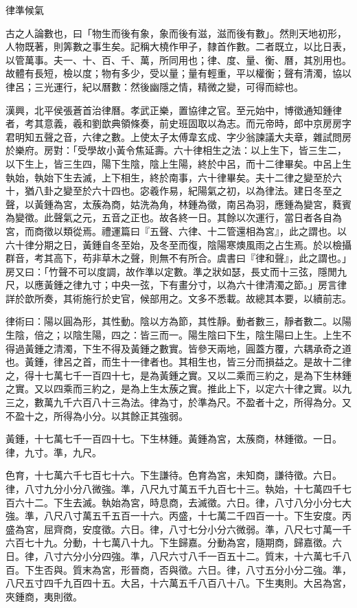 
\begin{pinyinscope}
律準候氣

古之人論數也，曰「物生而後有象，象而後有滋，滋而後有數」。然則天地初形，人物既著，則筭數之事生矣。記稱大橈作甲子，隸首作數。二者既立，以比日表，以管萬事。夫一、十、百、千、萬，所同用也；律、度、量、衡、曆，其別用也。故體有長短，檢以度；物有多少，受以量；量有輕重，平以權衡；聲有清濁，協以律呂；三光運行，紀以曆數：然後幽隱之情，精微之變，可得而綜也。

漢興，北平侯張蒼首治律曆。孝武正樂，置協律之官。至元始中，博徵通知鍾律者，考其意義，羲和劉歆典領條奏，前史班固取以為志。而元帝時，郎中京房房字君明知五聲之音，六律之數。上使太子太傅韋玄成、字少翁諫議大夫章，雜試問房於樂府。房對：「受學故小黃令焦延壽。六十律相生之法：以上生下，皆三生二，以下生上，皆三生四，陽下生陰，陰上生陽，終於中呂，而十二律畢矣。中呂上生執始，執始下生去滅，上下相生，終於南事，六十律畢矣。夫十二律之變至於六十，猶八卦之變至於六十四也。宓羲作易，紀陽氣之初，以為律法。建日冬至之聲，以黃鍾為宮，太蔟為商，姑洗為角，林鍾為徵，南呂為羽，應鍾為變宮，蕤賓為變徵。此聲氣之元，五音之正也。故各終一日。其餘以次運行，當日者各自為宮，而商徵以類從焉。禮運篇曰『五聲、六律、十二管還相為宮』，此之謂也。以六十律分期之日，黃鍾自冬至始，及冬至而復，陰陽寒燠風雨之占生焉。於以檢攝群音，考其高下，苟非草木之聲，則無不有所合。虞書曰『律和聲』，此之謂也。」房又曰：「竹聲不可以度調，故作準以定數。準之狀如瑟，長丈而十三弦，隱閒九尺，以應黃鍾之律九寸；中央一弦，下有畫分寸，以為六十律清濁之節。」房言律詳於歆所奏，其術施行於史官，候部用之。文多不悉載。故總其本要，以續前志。

律術曰：陽以圓為形，其性動。陰以方為節，其性靜。動者數三，靜者數二。以陽生陰，倍之；以陰生陽，四之：皆三而一。陽生陰曰下生，陰生陽曰上生。上生不得過黃鍾之清濁，下生不得及黃鍾之數實。皆參天兩地，圓蓋方覆，六耦承奇之道也。黃鍾，律呂之首，而生十一律者也。其相生也，皆三分而損益之。是故十二律之，得十七萬七千一百四十七，是為黃鍾之實。又以二乘而三約之，是為下生林鍾之實。又以四乘而三約之，是為上生太蔟之實。推此上下，以定六十律之實。以九三之，數萬九千六百八十三為法。律為寸，於準為尺。不盈者十之，所得為分。又不盈十之，所得為小分。以其餘正其強弱。

黃鍾，十七萬七千一百四十七。下生林鍾。黃鍾為宮，太蔟商，林鍾徵。一日。律，九寸。準，九尺。

色育，十七萬六千七百七十六。下生謙待。色育為宮，未知商，謙待徵。六日。律，八寸九分小分八微強。準，八尺九寸萬五千九百七十三。執始，十七萬四千七百六十二。下生去滅。執始為宮，時息商，去滅徵。六日。律，八寸八分小分七大強。準，八尺八寸萬五千五百一十六。丙盛，十七萬二千四百一十。下生安度。丙盛為宮，屈齊商，安度徵。六日。律，八寸七分小分六微弱。準，八尺七寸萬一千六百七十九。分動，十七萬八十九。下生歸嘉。分動為宮，隨期商，歸嘉徵。六日。律，八寸六分小分四強。準，八尺六寸八千一百五十二。質末，十六萬七千八百。下生否與。質末為宮，形晉商，否與徵。六日。律，八寸五分小分二強。準，八尺五寸四千九百四十五。大呂，十六萬五千八百八十八。下生夷則。大呂為宮，夾鍾商，夷則徵。


\end{pinyinscope}

